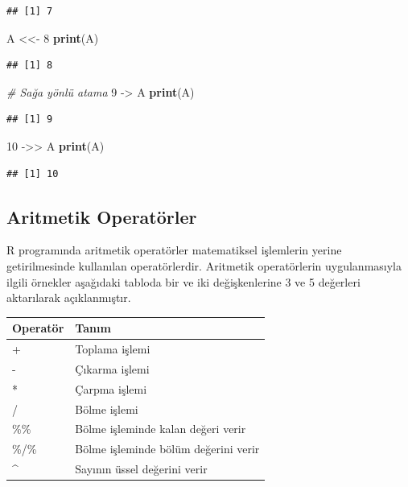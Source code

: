 \documentclass[
]{book}
\newenvironment{Shaded}{\begin{snugshade}}{\end{snugshade}}
\newcommand{\CommentTok}[1]{\textcolor[rgb]{0.56,0.35,0.01}{\textit{#1}}}
\newcommand{\DecValTok}[1]{\textcolor[rgb]{0.00,0.00,0.81}{#1}}
\newcommand{\FunctionTok}[1]{\textcolor[rgb]{0.13,0.29,0.53}{\textbf{#1}}}
\newcommand{\NormalTok}[1]{#1}
\newcommand{\OtherTok}[1]{\textcolor[rgb]{0.56,0.35,0.01}{#1}}
\begin{document}
\begin{verbatim}
## [1] 7
\end{verbatim}

\begin{Shaded}
\begin{Highlighting}[]
\NormalTok{A }\OtherTok{\textless{}\textless{}{-}} \DecValTok{8}
\FunctionTok{print}\NormalTok{(A)}
\end{Highlighting}
\end{Shaded}

\begin{verbatim}
## [1] 8
\end{verbatim}

\begin{Shaded}
\begin{Highlighting}[]
\CommentTok{\# Sağa yönlü atama}
\DecValTok{9} \OtherTok{{-}\textgreater{}}\NormalTok{ A}
\FunctionTok{print}\NormalTok{(A)}
\end{Highlighting}
\end{Shaded}

\begin{verbatim}
## [1] 9
\end{verbatim}

\begin{Shaded}
\begin{Highlighting}[]
\DecValTok{10} \OtherTok{{-}\textgreater{}\textgreater{}}\NormalTok{ A}
\FunctionTok{print}\NormalTok{(A)}
\end{Highlighting}
\end{Shaded}

\begin{verbatim}
## [1] 10
\end{verbatim}

\subsection{Aritmetik Operatörler}\label{aritmetik-operatuxf6rler}

R programında aritmetik operatörler matematiksel işlemlerin yerine getirilmesinde kullanılan operatörlerdir. Aritmetik operatörlerin uygulanmasıyla ilgili örnekler aşağıdaki tabloda bir ve iki değişkenlerine 3 ve 5 değerleri aktarılarak açıklanmıştır.

\begin{tabular}{ll}
\toprule
Operatör & Tanım\\
\midrule
+ & Toplama işlemi\\
- & Çıkarma işlemi\\
* & Çarpma işlemi\\
/ & Bölme işlemi\\
\%\% & Bölme işleminde kalan değeri verir\\
\addlinespace
\%/\% & Bölme işleminde bölüm değerini verir\\
\textasciicircum{} & Sayının üssel değerini verir\\
\bottomrule
\end{tabular}
\end{document}
